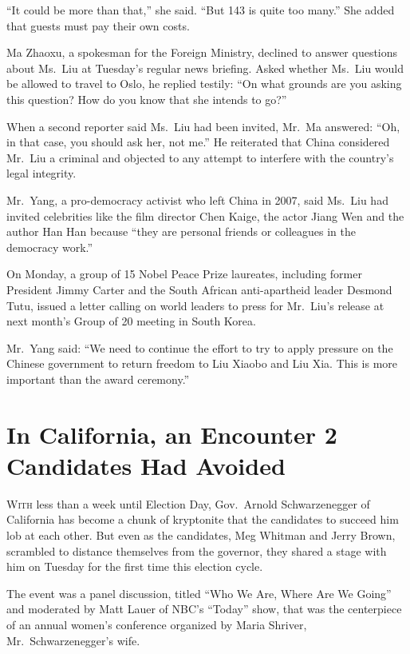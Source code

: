 ﻿\documentclass[12pt]{article}
\begin{document}
``It could be more than that,'' she said. ``But 143 is quite too many.'' She added that guests must
pay their own costs.

Ma Zhaoxu, a spokesman for the Foreign Ministry, declined to answer questions about Ms.~Liu at
Tuesday's regular news briefing. Asked whether Ms.~Liu would be allowed to travel to Oslo, he
replied testily: ``On what grounds are you asking this question? How do you know that she intends to
go?''

When a second reporter said Ms.~Liu had been invited, Mr.~Ma answered: ``Oh, in that case, you
should ask her, not me.'' He reiterated that China considered Mr.~Liu a criminal and objected to any
attempt to interfere with the country's legal integrity.

Mr.~Yang, a pro-democracy activist who left China in 2007, said Ms.~Liu had invited celebrities like
the film director Chen Kaige, the actor Jiang Wen and the author Han Han because ``they are personal
friends or colleagues in the democracy work.''

On Monday, a group of 15 Nobel Peace Prize laureates, including former President Jimmy Carter and
the South African anti-apartheid leader Desmond Tutu, issued a letter calling on world leaders to
press for Mr.~Liu's release at next month's Group of 20 meeting in South Korea.

Mr.~Yang said: ``We need to continue the effort to try to apply pressure on the Chinese government
to return freedom to Liu Xiaobo and Liu Xia. This is more important than the award ceremony.''

\section{In California, an Encounter 2 Candidates Had Avoided}

\lettrine{W}{ith} less than a week until Election Day, Gov.~Arnold
Schwarzenegger of California has become a chunk of kryptonite that the candidates to succeed him lob
at each other. But even as the candidates, Meg Whitman and Jerry Brown, scrambled to distance
themselves from the governor, they shared a stage with him on Tuesday for the first time this
election cycle.

The event was a panel discussion, titled ``Who We Are, Where Are We Going'' and moderated by Matt
Lauer of NBC's ``Today'' show, that was the centerpiece of an annual women's conference organized by
Maria Shriver, Mr.~Schwarzenegger's wife.
\end{document}
